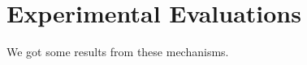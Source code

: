 \documentclass{article}
\begin{document}
\section{Experimental Evaluations}
We got some results from these mechanisms.






\end{document}
